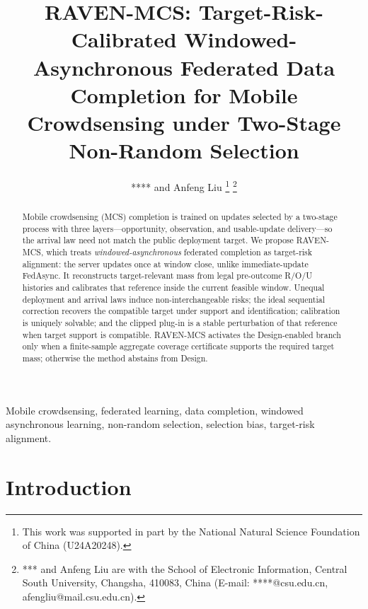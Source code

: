 \documentclass[letterpaper,journal]{IEEEtran}
\begin{document}
\title{RAVEN-MCS: Target-Risk-Calibrated Windowed-Asynchronous Federated Data Completion for Mobile Crowdsensing under Two-Stage Non-Random Selection}

\author{**** and Anfeng Liu%
\thanks{This work was supported in part by the National Natural Science Foundation of China (U24A20248).}%
\thanks{*** and Anfeng Liu are with the School of Electronic Information, Central South University, Changsha, 410083, China (E-mail: ****@csu.edu.cn, afengliu@mail.csu.edu.cn).}%
}


\maketitle





\begin{abstract}
Mobile crowdsensing (MCS) completion is trained on updates selected by a
two-stage process with three layers---opportunity, observation, and
usable-update delivery---so the arrival law need not match the public
deployment target.  We propose RAVEN-MCS, which treats
\emph{windowed-asynchronous} federated completion as target-risk alignment:
the server updates once at window close, unlike immediate-update FedAsync.
It reconstructs target-relevant mass from legal pre-outcome R/O/U histories
and calibrates that reference inside the current feasible window.
Unequal deployment and arrival laws induce non-interchangeable risks; the
ideal sequential correction recovers the compatible target under support
and identification; calibration is uniquely solvable; and the clipped
plug-in is a stable perturbation of that reference when target support is
compatible.  RAVEN-MCS activates the Design-enabled branch only when a
finite-sample aggregate coverage certificate supports the required target
mass; otherwise the method abstains from Design.
\end{abstract}

\begin{IEEEkeywords}
Mobile crowdsensing, federated learning, data completion, windowed asynchronous learning, non-random selection, selection bias, target-risk alignment.
\end{IEEEkeywords}


\section{Introduction}
\label{sec:introduction}
\end{document}

